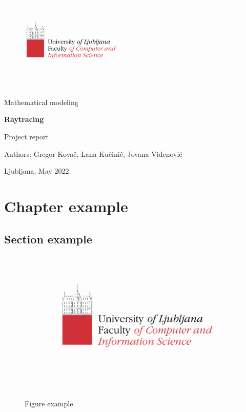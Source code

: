 \documentclass[12pt,a4paper]{report}
\begin{document}
\begin{titlepage}
    \centering
    \includegraphics[width=0.5\textwidth]{Logotype_FRI_en2_03.png}

    \vspace{7cm}
    {\LARGE Mathematical modeling\par}
    {\huge\bfseries Raytracing\par}
    {\Large Project report\par}
    \vfill

    Authors: Gregor Kovač, Lana Kučinič, Jovana Videnović
        
    {Ljubljana, May 2022}
\end{titlepage}

\thispagestyle{empty}

\tableofcontents

\thispagestyle{empty}

\listoffigures

\thispagestyle{empty}

\setcounter{page}{4}
\pagebreak

\chapter{Chapter example}
\section{Section example}

\begin{figure}[H]
    \includegraphics[width=1\textwidth]{Logotype_FRI_en2_03.png}
    \caption{Figure example}
\end{figure}
\end{document}
